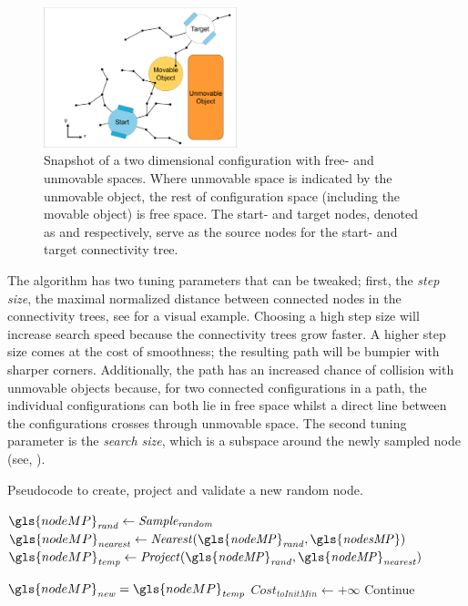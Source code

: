 \begin{figure}[H]
    \centering
    \includegraphics[width=0.5\textwidth, cfbox=my_grey 5pt 0pt]{figures/required_background/mp/1mp_init.drawio.png}
    \caption{Snapshot of a two dimensional configuration with free- and unmovable spaces. Where unmovable space is indicated by the unmovable object, the rest of configuration space (including the movable object) is free space. The start- and target nodes, denoted as  and  respectively, serve as the source nodes for the start- and target connectivity tree.}
    \label{fig:motion_planner_adding_one_node_all}
\end{figure}

The algorithm has two tuning parameters that can be tweaked; first, the \textit{step size}, the maximal normalized distance between connected nodes in the connectivity trees, see  for a visual example. Choosing a high step size will increase search speed because the connectivity trees grow faster. A higher step size comes at the cost of smoothness; the resulting path will be bumpier with sharper corners. Additionally, the path has an increased chance of collision with unmovable objects because, for two connected configurations in a path, the individual configurations can both lie in free space whilst a direct line between the configurations crosses through unmovable space. The second tuning parameter is the \textit{search size}, which is a subspace around the newly sampled node (see, ).\bs

\begin{algorithm}[H]
\caption{Pseudocode to create, project and validate a new random node.}%
\label{pseudocode:proposed_rrt_star_one}
\begin{algorithmic}[1]
  \hspace{-0.9cm}\colorbox{my_light_blue}{\parbox{\linewidth}{%
    \State $\gls{nodeMP}_\mathit{rand} \leftarrow \mathit{Sample_{random}}$
    \State $\gls{nodeMP}_\mathit{nearest} \leftarrow \mathit{Nearest(\gls{nodeMP}_{rand}, \gls{nodesMP})}$
    \State $\gls{nodeMP}_\mathit{temp} \leftarrow \mathit{Project(\gls{nodeMP}_{rand}, \gls{nodeMP}_{nearest})}$

    \State $\gls{nodeMP}_\mathit{new} = \gls{nodeMP}_\mathit{temp}$
    \State $Cost_\mathit{toInitMin} \leftarrow +\infty$
    \Else
        \State Continue
    \EndIf
}}
\end{algorithmic}
\end{algorithm}

